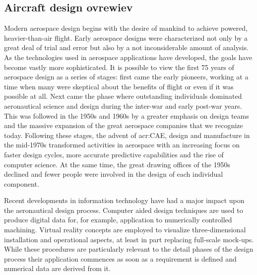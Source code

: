 \subsection{Aircraft design ovrewiev}
Modern aerospace design begins with the desire of mankind to achieve powered, heavier-than-air flight. Early aerospace designs were characterized not only by a great deal of trial and error but also by a not inconsiderable amount of analysis. As the technologies used in aerospace applications
have developed, the goals have become vastly more sophisticated. It is possible to view the first 75 years of aerospace design as a series of stages: first came the early pioneers, working at a time when many were skeptical about the benefits of flight or even if it was possible at all. Next came the phase where outstanding individuals dominated aeronautical science and design during the inter-war and early post-war years. This was followed in the 1950s and 1960s by a greater emphasis on design teams and the massive expansion of the great aerospace companies that we recognize today. Following these stages, the advent of \gls{acr:CAE}, design and  manufacture in the mid-1970s transformed activities in aerospace with an increasing focus on faster design cycles, more accurate predictive capabilities and the rise of computer science. At the same time, the great drawing offices of the 1950s declined and fewer people were involved in the design of each individual component.\cite{gambardella}

\bigskip
\noindent
Recent developments in information technology have had a major impact upon the aeronautical design process. Computer aided design techniques are used to produce digital data for, for example, application to numerically controlled machining. Virtual reality concepts are employed to visualize three-dimensional installation and operational aspects, at least in part replacing full-scale mock-ups. While these procedures are particularly relevant to the detail phases of the design process their application commences as soon as a requirement is defined and numerical data are derived from it.\cite{howe2000aircraft}

